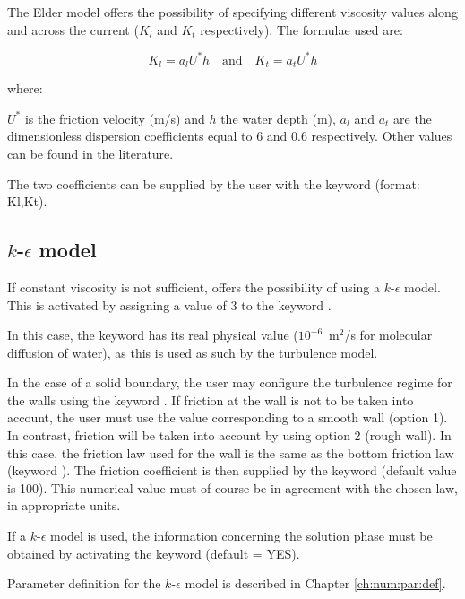 The Elder model offers the possibility of specifying different viscosity values
along and across the current ($K_l$ and $K_t$ respectively).
The formulae used are:

\begin{equation}
  K_l = a_l U^* h  \textrm{~~~and~~~}  K_t = a_t U^* h
\end{equation}

where:

$U^*$ is the friction velocity (m/s) and $h$ the water depth (m),
$a_l$ and $a_t$ are the dimensionless dispersion coefficients equal to 6 and 0.6
respectively.
Other values can be found in the literature.

The two coefficients can be supplied by the user with the keyword
 (format: Kl,Kt).


\subsection{$k$-$\epsilon$ model}

If constant viscosity is not sufficient,  offers the possibility
of using a $k$-$\epsilon$ model.
This is activated by assigning a value of 3 to the keyword
.

In this case, the keyword  has its real physical
value ($10^{-6}$~m$^2$/s for molecular diffusion of water), as this is used as
such by the turbulence model.

In the case of a solid boundary, the user may configure the turbulence regime
for the walls using the keyword .
If friction at the wall is not to be taken into account, the user must use the
value corresponding to a smooth wall (option 1).
In contrast, friction will be taken into account by using option 2 (rough wall).
In this case, the friction law used for the wall is the same as the bottom
friction law (keyword ).
The friction coefficient is then supplied by the keyword
 (default value is 100).
This numerical value must of course be in agreement with the chosen law,
in appropriate units.

If a $k$-$\epsilon$ model is used, the information concerning the solution phase
must be obtained by activating the keyword
 (default = YES).

Parameter definition for the $k$-$\epsilon$ model is described in Chapter
\ref{ch:num:par:def}.

